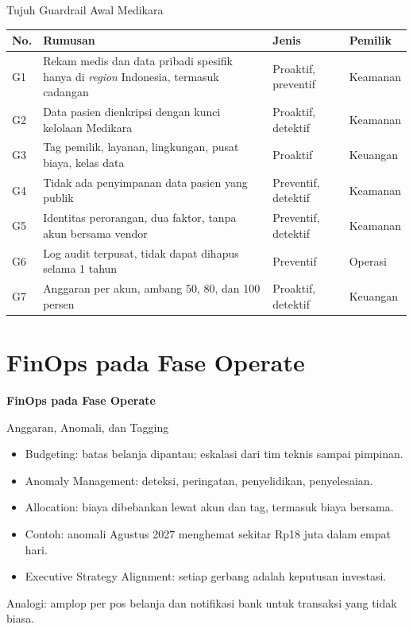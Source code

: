 \documentclass[aspectratio=169, table, 12pt]{beamer}
\begin{document}
\begin{frame}{{\Large Tujuh Guardrail Awal Medikara}}
  \footnotesize
  \begin{tabularx}{\textwidth}{>{\raggedright\arraybackslash}p{0.6cm}
      >{\raggedright\arraybackslash}X >{\raggedright\arraybackslash}p{2.6cm}
      >{\raggedright\arraybackslash}p{1.9cm}}
    \hline
    \textbf{No.} & \textbf{Rumusan} & \textbf{Jenis} & \textbf{Pemilik} \\ \hline
    G1 & Rekam medis dan data pribadi spesifik hanya di \textit{region} Indonesia, termasuk cadangan
      & Proaktif, preventif & Keamanan \\ \hline
    G2 & Data pasien dienkripsi dengan kunci kelolaan Medikara & Proaktif, detektif & Keamanan \\
      \hline
    G3 & Tag pemilik, layanan, lingkungan, pusat biaya, kelas data & Proaktif & Keuangan \\ \hline
    G4 & Tidak ada penyimpanan data pasien yang publik & Preventif, detektif & Keamanan \\ \hline
    G5 & Identitas perorangan, dua faktor, tanpa akun bersama vendor & Preventif, detektif &
      Keamanan \\ \hline
    G6 & Log audit terpusat, tidak dapat dihapus selama 1 tahun & Preventif & Operasi \\ \hline
    G7 & Anggaran per akun, ambang 50, 80, dan 100 persen & Proaktif, detektif & Keuangan \\ \hline
  \end{tabularx}
\end{frame}

\section{FinOps pada Fase Operate}

\begin{frame}{\hfill}
  \centering
  \Huge{\textbf{FinOps pada Fase Operate}}
\end{frame}

\begin{frame}{{\Large Anggaran, Anomali, dan Tagging}}
  \vspace{10pt}
  \begin{itemize}
    \item Budgeting: batas belanja dipantau; eskalasi dari tim teknis sampai pimpinan.
    \item Anomaly Management: deteksi, peringatan, penyelidikan, penyelesaian.
    \item Allocation: biaya dibebankan lewat akun dan tag, termasuk biaya bersama.
    \item Contoh: anomali Agustus 2027 menghemat sekitar Rp18 juta dalam empat hari.
    \item Executive Strategy Alignment: setiap gerbang adalah keputusan investasi.
  \end{itemize}
  \vspace{6pt}
  {\small Analogi: amplop per pos belanja dan notifikasi bank untuk transaksi yang tidak biasa.}
\end{frame}
\end{document}
